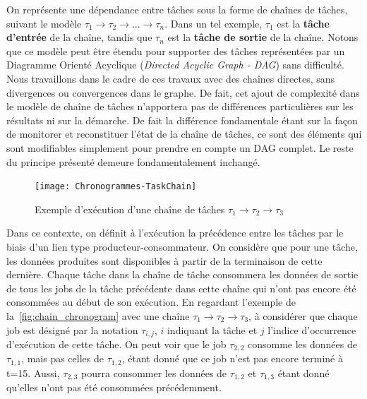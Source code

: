 \documentclass[french, a4paper, 11pt, twoside, pdftex]{StyleThese}
\begin{document}
	    
	    On représente une dépendance entre tâches sous la forme de chaînes de tâches, suivant le modèle $\tau_{1} \rightarrow \tau_2 \rightarrow \ldots \rightarrow \tau_n$. Dans un tel exemple, $\tau_1$ est la \textbf{tâche d'entrée} de la chaîne, tandis que $\tau_n$ est la \textbf{tâche de sortie} de la chaîne. Notons que ce modèle peut être étendu pour supporter des tâches représentées par un Diagramme Orienté Acyclique (\textit{Directed Acyclic Graph - DAG}) sans difficulté. Nous travaillons dans le cadre de ces travaux avec des chaînes directes, sans divergences ou convergences dans le graphe. De fait, cet ajout de complexité dans le modèle de chaîne de tâches n'apportera pas de différences particulières sur les résultats ni sur la démarche. De fait la différence fondamentale étant sur la façon de monitorer et reconstituer l'état de la chaîne de tâches, ce sont des éléments qui sont modifiables simplement pour prendre en compte un DAG complet. Le reste du principe présenté demeure fondamentalement inchangé.

	    \begin{figure}[ht]
	    	\centering
	    	\texttt{[image: Chronogrammes-TaskChain]}
	    	\caption{Exemple d'exécution d'une chaîne de tâches $\tau_1 \rightarrow \tau_2 \rightarrow \tau_3$}
	    	\label{fig:chain_chronogram}
	    \end{figure}
    
	    Dans ce contexte, on définit à l'exécution la précédence entre les tâches par le biais d'un lien type producteur-consommateur. On considère que pour une tâche, les données produites sont disponibles à partir de la terminaison de cette dernière. Chaque tâche dans la chaîne de tâche consommera les données de sortie de tous les jobs de la tâche précédente dans cette chaîne qui n'ont pas encore été consommées au début de son exécution. En regardant l'exemple de la~\autoref{fig:chain_chronogram} avec une chaîne $\tau_1 \rightarrow \tau_2 \rightarrow \tau_3$, à considérer que chaque job est désigné par la notation $ \tau_{i,j} $, $i$ indiquant la tâche et $j$ l'indice d'occurrence d'exécution de cette tâche. On peut voir que le job $ \tau_{2,2} $ consomme les données de $ \tau_{1,1} $, mais pas celles de $ \tau_{1,2} $, étant donné que ce job n'est pas encore terminé à t=15. Aussi, $ \tau_{2,3} $ pourra consommer les données de $ \tau_{1,2} $ et $ \tau_{1,3} $ étant donné qu'elles n'ont pas été consommées précédemment.
	    
\end{document}
